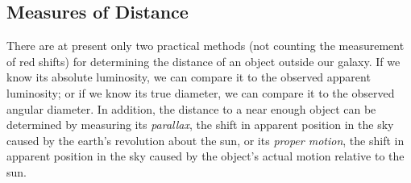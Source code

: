 %

\subsection{Measures of Distance}\label{sec:14.4}

There are at present only two practical methods (not counting the measurement
of red shifts) for determining the distance of an object outside our galaxy.
If we know its absolute luminosity, we can compare it to the observed apparent
luminosity; or if we know its true diameter, we can compare it to the observed
angular diameter. In addition, the distance to a near enough object can be
determined by measuring its \emph{parallax}, the shift in apparent position in
the sky caused by the earth's revolution about the sun, or its \emph{proper
motion}, the shift in apparent position in the sky caused by the object's
actual motion relative to the sun.


